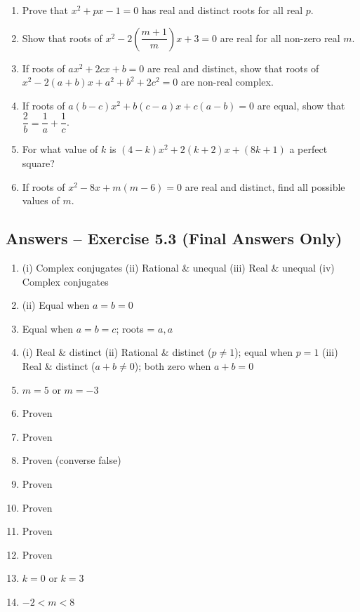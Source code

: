 \documentclass[12pt,a4paper]{article}
\begin{document}
\begin{enumerate}
    \item Prove that \( x^2 + px - 1 = 0 \) has real and distinct roots for all real \( p \).

    \item Show that roots of \( x^2 - 2\left( \dfrac{m+1}{m} \right)x + 3 = 0 \) are real for all non-zero real \( m \).

    \item If roots of \( ax^2 + 2cx + b = 0 \) are real and distinct, show that roots of \( x^2 - 2(a+b)x + a^2 + b^2 + 2c^2 = 0 \) are non-real complex.

    \item If roots of \( a(b-c)x^2 + b(c-a)x + c(a-b) = 0 \) are equal, show that \( \dfrac{2}{b} = \dfrac{1}{a} + \dfrac{1}{c} \).

    \item For what value of \( k \) is \( (4-k)x^2 + 2(k+2)x + (8k+1) \) a perfect square?

    \item If roots of \( x^2 - 8x + m(m-6) = 0 \) are real and distinct, find all possible values of \( m \).
\end{enumerate}

\subsection{Answers -- Exercise 5.3 (Final Answers Only)}

\begin{enumerate}
    \item (i) Complex conjugates \quad (ii) Rational \& unequal \quad (iii) Real \& unequal \quad (iv) Complex conjugates
    \item (ii) Equal when \( a = b = 0 \)
    \item Equal when \( a = b = c \); roots = \( a, a \)
    \item (i) Real \& distinct \quad (ii) Rational \& distinct (\( p \neq 1 \)); equal when \( p=1 \) \quad (iii) Real \& distinct (\( a+b \neq 0 \)); both zero when \( a+b=0 \)
    \item \( m = 5 \) or \( m = -3 \)
    \item Proven
    \item Proven
    \item Proven (converse false)
    \item Proven
    \item Proven
    \item Proven
    \item Proven
    \item \( k = 0 \) or \( k = 3 \)
    \item \( -2 < m < 8 \)
\end{enumerate}
\end{document}
